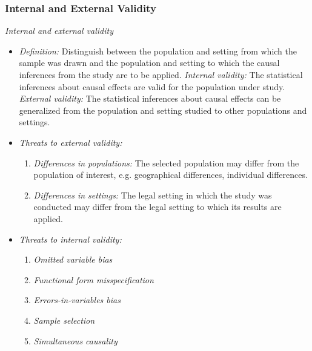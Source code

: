 

\begin{frame}
\frametitle{Internal and External Validity}
\emph{Internal and external validity}
\begin{itemize}
\item \emph{Definition:}
Distinguish between the population and setting from which the sample was drawn and the population and setting to which the causal inferences from the study are to be applied. 
\emph{Internal validity:} The statistical inferences about causal effects are valid for the population under study. 
\emph{External validity:} The statistical inferences about causal effects can be generalized from the population and setting studied to other populations and settings.
\item \emph{Threats to external validity:}
\begin{enumerate}
\item \emph{Differences in populations:}
The selected population may differ from the population of interest, e.g. geographical differences, individual differences.  
\item \emph{Differences in settings:}
The legal setting in which the study was conducted may differ from the legal setting to which its results are applied.
\end{enumerate}
\item \emph{Threats to internal validity:}
\begin{enumerate}
\item \emph{Omitted variable bias}
\item \emph{Functional form misspecification}
\item \emph{Errors-in-variables bias}
\item \emph{Sample selection}
\item \emph{Simultaneous causality}
\end{enumerate}
\end{itemize}
\end{frame}

